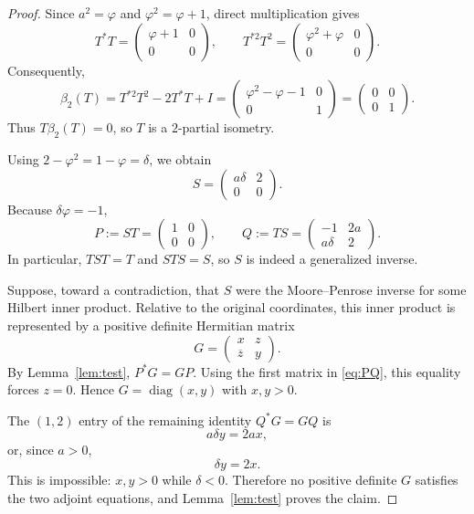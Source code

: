 \documentclass[11pt]{article}
\begin{document}
\begin{proof}
Since $a^2=\varphi$ and $\varphi^2=\varphi+1$, direct multiplication gives
\[
 T^*T=\begin{pmatrix}\varphi+1&0\\0&0\end{pmatrix},
 \qquad
 T^{*2}T^2=\begin{pmatrix}\varphi^2+\varphi&0\\0&0\end{pmatrix}.
\]
Consequently,
\[
 \beta_2(T)=T^{*2}T^2-2T^*T+I
 =\begin{pmatrix}
 \varphi^2-\varphi-1&0\\0&1
 \end{pmatrix}
 =\begin{pmatrix}0&0\\0&1\end{pmatrix}.
\]
Thus $T\beta_2(T)=0$, so $T$ is a $2$-partial isometry.

Using $2-\varphi^2=1-\varphi=\delta$, we obtain
\[
 S=\begin{pmatrix}a\delta&2\\0&0\end{pmatrix}.
\]
Because $\delta\varphi=-1$,
\begin{equation}\label{eq:PQ}
 P:=ST=\begin{pmatrix}1&0\\0&0\end{pmatrix},
 \qquad
 Q:=TS=\begin{pmatrix}-1&2a\\a\delta&2\end{pmatrix}.
\end{equation}
In particular, $TST=T$ and $STS=S$, so $S$ is indeed a generalized inverse.

Suppose, toward a contradiction, that $S$ were the Moore--Penrose inverse for
some Hilbert inner product.  Relative to the original coordinates, this
inner product is represented by a positive definite Hermitian matrix
\[
 G=\begin{pmatrix}x&z\\\overline z&y\end{pmatrix}.
\]
By Lemma~\ref{lem:test}, $P^*G=GP$.  Using the first matrix in
\eqref{eq:PQ}, this equality forces $z=0$.  Hence
$G=\operatorname{diag}(x,y)$ with $x,y>0$.

The $(1,2)$ entry of the remaining identity $Q^*G=GQ$ is
\[
 a\delta y=2ax,
\]
or, since $a>0$,
\[
 \delta y=2x.
\]
This is impossible: $x,y>0$ while $\delta<0$.  Therefore no positive
definite $G$ satisfies the two adjoint equations, and Lemma~\ref{lem:test}
proves the claim.
\end{proof}
\end{document}
